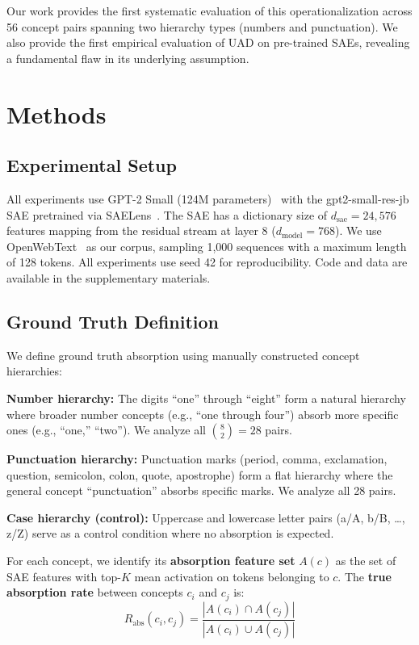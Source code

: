 \documentclass{article}
\begin{document}
Our work provides the first systematic evaluation of this operationalization across 56 concept pairs spanning two hierarchy types (numbers and punctuation). We also provide the first empirical evaluation of UAD on pre-trained SAEs, revealing a fundamental flaw in its underlying assumption.

\section{Methods}
\label{sec:methods}

\subsection{Experimental Setup}

All experiments use GPT-2 Small (124M parameters)~\citep{radford2019language} with the gpt2-small-res-jb SAE pretrained via SAELens~\citep{templeton2024scaling}. The SAE has a dictionary size of $d_{\text{sae}} = 24{,}576$ features mapping from the residual stream at layer 8 ($d_{\text{model}} = 768$). We use OpenWebText~\citep{gokaslan2019openwebtext} as our corpus, sampling 1,000 sequences with a maximum length of 128 tokens. All experiments use seed 42 for reproducibility. Code and data are available in the supplementary materials.

\subsection{Ground Truth Definition}

We define ground truth absorption using manually constructed concept hierarchies:

\textbf{Number hierarchy:} The digits ``one'' through ``eight'' form a natural hierarchy where broader number concepts (e.g., ``one through four'') absorb more specific ones (e.g., ``one,'' ``two''). We analyze all $\binom{8}{2} = 28$ pairs.

\textbf{Punctuation hierarchy:} Punctuation marks (period, comma, exclamation, question, semicolon, colon, quote, apostrophe) form a flat hierarchy where the general concept ``punctuation'' absorbs specific marks. We analyze all 28 pairs.

\textbf{Case hierarchy (control):} Uppercase and lowercase letter pairs (a/A, b/B, \ldots, z/Z) serve as a control condition where no absorption is expected.

For each concept, we identify its \textbf{absorption feature set} $A(c)$ as the set of SAE features with top-$K$ mean activation on tokens belonging to $c$. The \textbf{true absorption rate} between concepts $c_i$ and $c_j$ is:
\begin{equation}
R_{\text{abs}}(c_i, c_j) = \frac{|A(c_i) \cap A(c_j)|}{|A(c_i) \cup A(c_j)|}
\end{equation}
\end{document}
